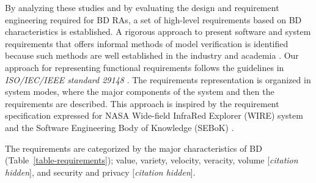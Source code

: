 \documentclass[a4paper,11pt]{article}
\let\cite\citep
\newcommand{\hc}{[\textit{citation hidden}]\textnormal{}}
\begin{document}
By analyzing these studies and by evaluating the design and requirement engineering required for BD RAs, a set of high-level requirements based on BD characteristics is established. A rigorous approach to present software and system requirements that offers informal methods of model verification is identified because such methods are well established in the industry and academia \cite{kassab2014state}.  Our approach for representing functional requirements follows the guidelines in \emph{ISO/IEC/IEEE standard 29148} \cite{ISO29148}. The requirements representation is organized in system modes, where the major components of the system and then the requirements are described. This approach is inspired by the requirement specification expressed for NASA Wide-field InfraRed Explorer (WIRE) system \cite{laplante2017requirements} and the Software Engineering Body of Knowledge (SEBoK) \cite{abran2004software}.

The requirements are categorized by the major characteristics of BD (Table~\ref{table-requirements}); value, variety, velocity, veracity, volume %
\hc{},
 and security and privacy 
\hc{}.
\end{document}
